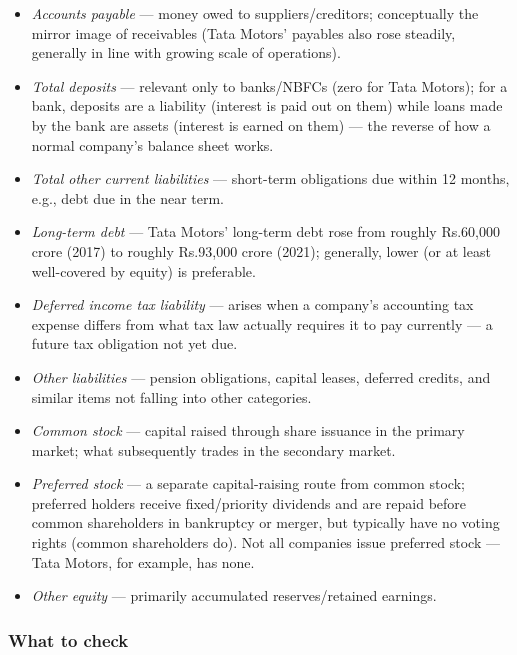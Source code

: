 \documentclass[12pt,openany]{book}
\begin{document}
\begin{itemize}[leftmargin=*]
    \item \emph{Accounts payable} --- money owed to suppliers/creditors; conceptually the mirror image of receivables (Tata Motors' payables also rose steadily, generally in line with growing scale of operations).
    \item \emph{Total deposits} --- relevant only to banks/NBFCs (zero for Tata Motors); for a bank, deposits are a liability (interest is paid out on them) while loans made by the bank are assets (interest is earned on them) --- the reverse of how a normal company's balance sheet works.
    \item \emph{Total other current liabilities} --- short-term obligations due within 12 months, e.g., debt due in the near term.
    \item \emph{Long-term debt} --- Tata Motors' long-term debt rose from roughly Rs.60,000 crore (2017) to roughly Rs.93,000 crore (2021); generally, lower (or at least well-covered by equity) is preferable.
    \item \emph{Deferred income tax liability} --- arises when a company's accounting tax expense differs from what tax law actually requires it to pay currently --- a future tax obligation not yet due.
    \item \emph{Other liabilities} --- pension obligations, capital leases, deferred credits, and similar items not falling into other categories.
    \item \emph{Common stock} --- capital raised through share issuance in the primary market; what subsequently trades in the secondary market.
    \item \emph{Preferred stock} --- a separate capital-raising route from common stock; preferred holders receive fixed/priority dividends and are repaid before common shareholders in bankruptcy or merger, but typically have no voting rights (common shareholders do). Not all companies issue preferred stock --- Tata Motors, for example, has none.
    \item \emph{Other equity} --- primarily accumulated reserves/retained earnings.
\end{itemize}

\subsubsection{What to check}
\end{document}

